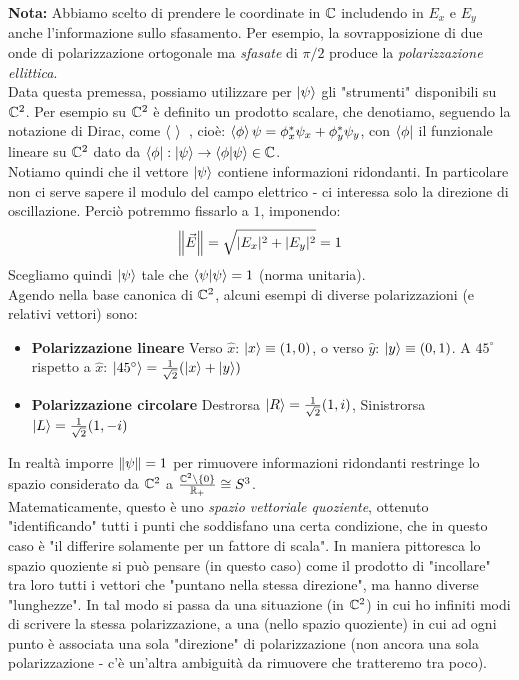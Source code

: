 \documentclass[FisicaTeorica.tex]{subfiles}
\begin{document}
\textbf{Nota:} Abbiamo scelto di prendere le coordinate in $\mathbb{C}$ includendo in $E_x$ e $E_y$ anche l'informazione sullo sfasamento. Per esempio, la sovrapposizione di due onde di polarizzazione ortogonale ma \textit{sfasate} di $\pi/2$ produce la \textit{polarizzazione ellittica}.\\
Data questa premessa, possiamo utilizzare per $\ket{\psi}$ gli "strumenti" disponibili su $\mathbb{C}^2$. Per esempio su $\mathbb{C}^2$ è definito un prodotto scalare, che denotiamo, seguendo la notazione di Dirac, come $\braket{\ }{\ }$, cioè: $\braket{\phi}{\psi} = \phi_x^* \psi_x + \phi_y^* \psi_y$, con $\bra{\phi}$ il funzionale lineare su $\mathbb{C}^2$ dato da $\bra{\phi}: \ket{\psi} \to \braket{\phi|\psi} \in \mathbb{C}$.\\
Notiamo quindi che il vettore $\ket{\psi}$ contiene informazioni ridondanti. In particolare non ci serve sapere il modulo del campo elettrico - ci interessa solo la direzione di oscillazione. Perciò potremmo fissarlo a $1$, imponendo: 
\[
\left\lVert\vec{E}\right\rVert = \sqrt{|E_x|^2 + |E_y|^2} = 1
\]
Scegliamo quindi $\ket{\psi}$ tale che $\braket{\psi|\psi} = 1$ (norma unitaria).\\
Agendo nella base canonica di $\mathbb{C}^2$, alcuni esempi di diverse polarizzazioni (e relativi vettori) sono:
\begin{itemize}
    \item \textbf{Polarizzazione lineare} Verso $\hat{x}$: $\ket{x} \equiv (1,0)$, o verso $\hat{y}$: $\ket{y}\equiv (0,1)$. A $45^\circ$ rispetto a $\hat{x}$: $\ket{45^\circ} = \frac{1}{\sqrt{2}}(\ket{x}+\ket{y})$
    \item \textbf{Polarizzazione circolare} Destrorsa $\ket{R} = \frac{1}{\sqrt{2}}(1,i)$, Sinistrorsa $\ket{L} = \frac{1}{\sqrt{2}}(1,-i)$
\end{itemize}
In realtà imporre $\left\lVert\psi\right\rVert = 1$ per rimuovere informazioni ridondanti restringe lo spazio considerato da $\mathbb{C}^2$ a $\frac{\mathbb{C}^2\setminus\{0\}}{\mathbb{R}_+} \cong S^3$.\\
Matematicamente, questo è uno \textit{spazio vettoriale quoziente}, ottenuto "identificando" tutti i punti che soddisfano una certa condizione, che in questo caso è "il differire solamente per un fattore di scala". In maniera pittoresca lo spazio quoziente si può pensare (in questo caso) come il prodotto di "incollare" tra loro tutti i vettori che "puntano nella stessa direzione", ma hanno diverse "lunghezze". In tal modo si passa da una situazione (in $\mathbb{C}^2$) in cui ho infiniti modi di scrivere la stessa polarizzazione, a una (nello spazio quoziente) in cui ad ogni punto è associata una sola "direzione" di polarizzazione (non ancora una sola polarizzazione - c'è un'altra ambiguità da rimuovere che tratteremo tra poco).\\
\end{document}

